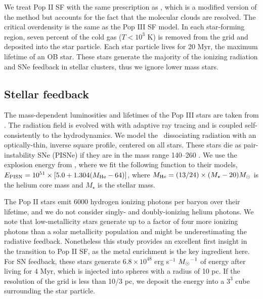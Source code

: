 \documentclass[apjl]{emulateapj}
\begin{document}
%

We treat Pop II SF with the same prescription as \citet{Wise09}, which
is a modified version of the \citet{Cen92} method but accounts for the
fact that the molecular clouds are resolved.  The critical overdensity
is the same as the Pop III SF model.  In each star-forming region,
seven percent of the cold gas ($T < 10^3$ K) is removed from the grid
and deposited into the star particle.  Each star particle lives for 20
Myr, the maximum lifetime of an OB star.  These stars generate the
majority of the ionizing radiation and SNe feedback in stellar
clusters, thus we ignore lower mass stars.

\subsection{Stellar feedback}

The mass-dependent luminosities and lifetimes of the Pop III stars are
taken from \citet{Schaerer02}.  The radiation field is evolved with
with adaptive ray tracing \citep{Abel02_RT, Wise10} and is coupled
self-consistently to the hydrodynamics.  We model the \hh~dissociating
radiation with an optically-thin, inverse square profile, centered on
all stars.  These stars die as pair-instability SNe (PISNe) if they
are in the mass range 140--260 \Ms \citep{Heger03}.  We use the
explosion energy from \citet{Heger02}, where we fit the following
function to their models, $E_{\rm PISN} = 10^{51} \times [5.0 + 1.304
(M_{\rm He} - 64)]$, where $M_{\rm He} = (13/24) \times (M_\star - 20)
\Ms$ is the helium core mass and $M_\star$ is the stellar mass.

The Pop II stars emit 6000 hydrogen ionizing photons per baryon over
their lifetime, and we do not consider singly- and doubly-ionizing
helium photons.  We note that low-metallicity stars generate up to a
factor of four more ionizing photons than a solar metallicity
population \citep{Schaerer03} and might be underestimating the
radiative feedback.  Nonetheless this study provides an excellent
first insight in the transition to Pop II SF, as the metal enrichment
is the key ingredient here.  For SN feedback, these stars generate
$6.8 \times 10^{48}$ erg s$^{-1}$ $\Ms^{-1}$ of energy after living
for 4 Myr, which is injected into spheres with a radius of 10 pc.  If
the resolution of the grid is less than 10/3 pc, we deposit the energy
into a $3^3$ cube surrounding the star particle.
\end{document}
